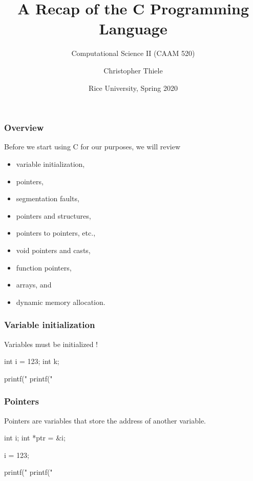 \documentclass[12pt,t]{beamer}
\let\emph\relax %
\begin{document}
  \title{A Recap of the C Programming Language}
  \subtitle{Computational Science II (CAAM 520)}
  \author{Christopher Thiele}
  \date{Rice University, Spring 2020}

  \begin{frame}
    \titlepage
  \end{frame}


  \begin{frame}
    \frametitle{Overview}

    Before we start using C for our purposes, we will review
    \begin{itemize}
      \item variable initialization,
      \item pointers,
      \item segmentation faults,
      \item pointers and structures,
      \item pointers to pointers, etc.,
      \item void pointers and casts,
      \item function pointers,
      \item arrays, and
      \item dynamic memory allocation.
    \end{itemize}
  \end{frame}

  \begin{frame}[fragile]
    \frametitle{Variable initialization}

    Variables must be initialized \emph{explicitly}!
    \begin{code}
int i = 123;
int k;

printf("%
printf("%
    \end{code}
  \end{frame}

  \begin{frame}[fragile]
    \frametitle{Pointers}

    Pointers are variables that store the address of another variable.
    \begin{code}
int i;
int *ptr = &i;

i = 123;

printf("%
printf("%
    \end{code}
  \end{frame}
\end{document}
